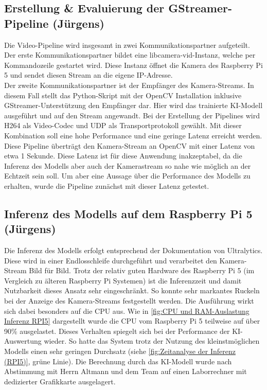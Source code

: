 \subsection{Erstellung \& Evaluierung der GStreamer-Pipeline (Jürgens)}
Die Video-Pipeline wird insgesamt in zwei Kommunikationspartner aufgeteilt. Der erste Kommunikationspartner bildet eine libcamera-vid-Instanz, welche per Kommandozeile gestartet wird. Diese Instanz öffnet die Kamera des Raspberry Pi 5 und sendet diesen Stream an die eigene IP-Adresse. \\
Der zweite Kommunikationspartner ist der Empfänger des Kamera-Streams. In diesem Fall stellt das Python-Skript mit der OpenCV Installation inklusive GStreamer-Unterstützung den Empfänger dar. Hier wird das trainierte KI-Modell ausgeführt und auf den Stream angewandt.
Bei der Erstellung der Pipelines wird H264 als Video-Codec und UDP als Transportprotokoll gewählt. Mit dieser Kombination soll eine hohe Performance und eine geringe Latenz erreicht werden.\\
Diese Pipeline überträgt den Kamera-Stream an OpenCV mit einer Latenz von etwa 1 Sekunde. Diese Latenz ist für diese Anwendung inakzeptabel, da die Inferenz des Modells aber auch der Kamerastream so nahe wie möglich an der Echtzeit sein soll. Um aber eine Aussage über die Performance des Modells zu erhalten, wurde die Pipeline zunächst mit dieser Latenz getestet.

\subsection{Inferenz des Modells auf dem Raspberry Pi 5 (Jürgens) \label{sec:inference_raspberry}}
Die Inferenz des Modells erfolgt entsprechend der Dokumentation von Ultralytics. Diese wird in einer Endlosschleife durchgeführt und verarbeitet den Kamera-Stream Bild für Bild. Trotz der relativ guten Hardware des Raspberry Pi 5 (im Vergleich zu älteren Raspberry Pi Systemen) ist die Inferenzzeit und damit Nutzbarkeit dieses Ansatz sehr eingeschränkt. So konnte sehr markantes Ruckeln bei der Anzeige des Kamera-Streams festgestellt werden. Die Ausführung wirkt sich dabei besonders auf die CPU aus. Wie in \ref{fig:CPU und RAM-Auslastung Inferenz RPI5} dargestellt wurde die CPU vom Raspberry Pi 5 teilweise auf über 90\% ausgelastet. Dieses Verhalten spiegelt sich bei der Performance der KI-Auswertung wieder. So hatte das System trotz der Nutzung des kleinstmöglichen Modells einen sehr geringen Durchsatz (siehe \ref{fig:Zeitanalyse der Inferenz (RPI5)}, grüne Linie). Die Berechnung durch das KI-Modell wurde nach Abstimmung mit Herrn Altmann und dem Team auf einen Laborrechner mit dedizierter Grafikkarte ausgelagert.

